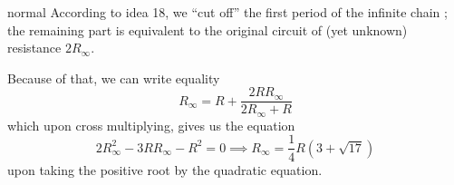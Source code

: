 \begin{solution}{normal}
According to idea 18,  we “cut off” the first period of the infinite chain ; the remaining part is equivalent to the original circuit of (yet unknown) resistance $2R_{\infty}$. 
\begin{center}
\end{center}
Because of that, we can write equality
\[R_{\infty} = R + \frac{2RR_{\infty}}{2R_{\infty} + R}\]
which upon cross multiplying, gives us the equation 
\[2R_{\infty}^2 - 3RR_{\infty} - R^2 = 0\implies R_{\infty} = \frac{1}{4}R(3 + \sqrt{17})\]
upon taking the positive root by the quadratic equation.
\end{solution}